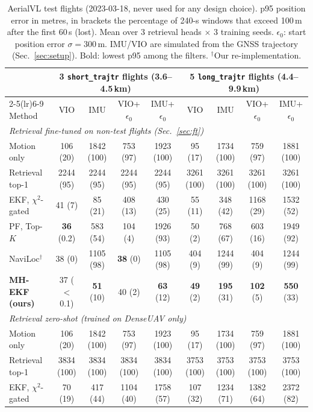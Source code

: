 \begin{table}[t]
\centering
\caption{AerialVL test flights (2023-03-18, never used for any design choice). p95 position error in metres, in brackets the percentage of 240-s windows that exceed 100\,m after the first 60\,s (lost). Mean over 3 retrieval heads $\times$ 3 training seeds. $\epsilon_0$: start position error $\sigma=300$\,m. IMU/VIO are simulated from the GNSS trajectory (Sec.~\ref{sec:setup}). Bold: lowest p95 among the filters. $^\dagger$Our re-implementation.}
\label{tab:aerialvl}
\setlength{\tabcolsep}{4pt}
\small
\begin{tabular}{lcccccccc}
\toprule
 & \multicolumn{4}{c}{3 \texttt{short\_trajtr} flights (3.6--4.5\,km)} & \multicolumn{4}{c}{5 \texttt{long\_trajtr} flights (4.4--9.9\,km)} \\
\cmidrule(lr){2-5}\cmidrule(lr){6-9}
Method & VIO & IMU & VIO+$\epsilon_0$ & IMU+$\epsilon_0$ & VIO & IMU & VIO+$\epsilon_0$ & IMU+$\epsilon_0$ \\
\midrule
\multicolumn{9}{l}{\emph{Retrieval fine-tuned on non-test flights (Sec.~\ref{sec:ft})}} \\
Motion only & 106 (20) & 1842 (100) & 753 (97) & 1923 (100) & 95 (17) & 1734 (100) & 759 (97) & 1881 (100) \\
Retrieval top-1 & 2244 (95) & 2244 (95) & 2244 (95) & 2244 (95) & 3261 (100) & 3261 (100) & 3261 (100) & 3261 (100) \\
EKF, $\chi^2$-gated & 41 (7) & 85 (21) & 408 (13) & 430 (25) & 55 (11) & 348 (42) & 1168 (29) & 1532 (52) \\
PF, Top-$K$ & \textbf{36} (0.2) & 583 (54) & 104 (4) & 1926 (93) & 50 (2) & 768 (67) & 603 (16) & 1949 (92) \\
NaviLoc$^\dagger$ \cite{shpagin2026naviloc} & 38 (0) & 1105 (98) & \textbf{38} (0) & 1105 (98) & 404 (9) & 1244 (99) & 404 (9) & 1244 (99) \\
\textbf{MH-EKF (ours)} & 37 ($<$0.1) & \textbf{51} (10) & 40 (2) & \textbf{63} (12) & \textbf{49} (2) & \textbf{195} (31) & \textbf{102} (5) & \textbf{550} (33) \\
\midrule
\multicolumn{9}{l}{\emph{Retrieval zero-shot (trained on DenseUAV only)}} \\
Motion only & 106 (20) & 1842 (100) & 753 (97) & 1923 (100) & 95 (17) & 1734 (100) & 759 (97) & 1881 (100) \\
Retrieval top-1 & 3834 (100) & 3834 (100) & 3834 (100) & 3834 (100) & 3753 (100) & 3753 (100) & 3753 (100) & 3753 (100) \\
EKF, $\chi^2$-gated & 70 (19) & 417 (44) & 1104 (40) & 1758 (57) & 107 (32) & 1234 (71) & 1382 (64) & 2372 (82) \\

\end{tabular}
\end{table}
